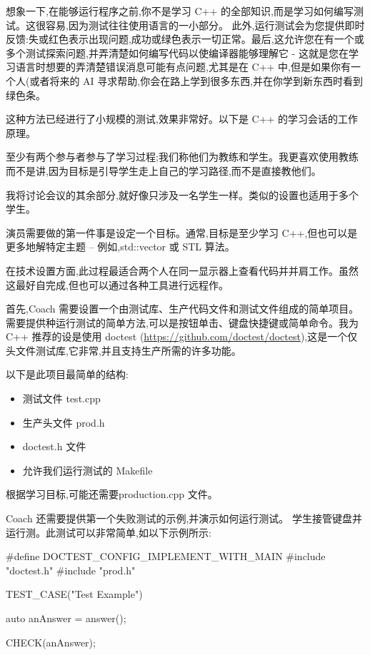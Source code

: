 想象一下,在能够运行程序之前,你不是学习 C++ 的全部知识,而是学习如何编写测试。这很容易,因为测试往往使用语言的一小部分。 此外,运行测试会为您提供即时反馈:失或红色表示出现问题,成功或绿色表示一切正常。最后,这允许您在有一个或多个测试探索问题,并弄清楚如何编写代码以使编译器能够理解它 - 这就是您在学习语言时想要的弄清楚错误消息可能有点问题,尤其是在 C++ 中,但是如果你有一个人(或者将来的 AI 寻求帮助,你会在路上学到很多东西,并在你学到新东西时看到绿色条。

这种方法已经进行了小规模的测试,效果非常好。以下是 C++ 的学习会话的工作原理。


至少有两个参与者参与了学习过程;我们称他们为教练和学生。我更喜欢使用教练而不是讲,因为目标是引导学生走上自己的学习路径,而不是直接教他们。

我将讨论会议的其余部分,就好像只涉及一名学生一样。类似的设置也适用于多个学生。

演员需要做的第一件事是设定一个目标。通常,目标是至少学习 C++,但也可以是更多地解特定主题 – 例如,std::vector 或 STL 算法。

在技术设置方面,此过程最适合两个人在同一显示器上查看代码并并肩工作。虽然这最好自完成,但也可以通过各种工具进行远程作。

首先,Coach 需要设置一个由测试库、生产代码文件和测试文件组成的简单项目。需要提供种运行测试的简单方法,可以是按钮单击、键盘快捷键或简单命令。我为 C++ 推荐的设是使用 doctest (\url{https://github.com/doctest/doctest}),这是一个仅头文件测试库,它非常,并且支持生产所需的许多功能。

以下是此项目最简单的结构:

\begin{itemize}
\item 
测试文件 test.cpp

\item 
生产头文件 prod.h

\item 
doctest.h 文件

\item 
允许我们运行测试的 Makefile
\end{itemize}

根据学习目标,可能还需要production.cpp 文件。

Coach 还需要提供第一个失败测试的示例,并演示如何运行测试。 学生接管键盘并运行测。此测试可以非常简单,如以下示例所示:

\begin{cpp}
#define DOCTEST_CONFIG_IMPLEMENT_WITH_MAIN
#include "doctest.h"
#include "prod.h"

TEST_CASE("Test Example"){
  auto anAnswer = answer();

  CHECK(anAnswer);
}
\end{cpp}

